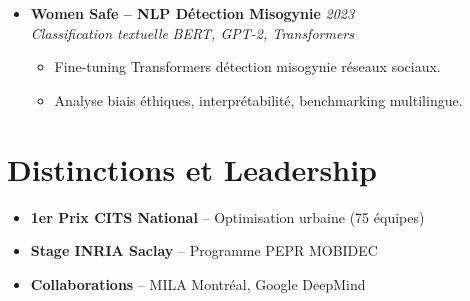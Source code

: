 \documentclass[a4paper,11pt]{article}
\begin{document}
\begin{itemize}[leftmargin=0.5cm, nosep]
    \item \textbf{Women Safe -- NLP D\'etection Misogynie} \hfill \textit{2023} \\
    \textit{Classification textuelle} \hfill \textit{BERT, GPT-2, Transformers}
    \vspace{-2pt}
    \begin{itemize}[leftmargin=0.4cm, nosep, label=\tiny$\bullet$]
        \item \small{Fine-tuning Transformers d\'etection misogynie r\'eseaux sociaux.}
        \item \small{Analyse biais \'ethiques, interpr\'etabilit\'e, benchmarking multilingue.}
    \end{itemize}
\end{itemize}

\section{Distinctions et Leadership}
\begin{itemize}[leftmargin=0.5cm, nosep]
    \item \textbf{1er Prix CITS National} -- Optimisation urbaine (75 \'equipes)
    \item \textbf{Stage INRIA Saclay} -- Programme PEPR MOBIDEC
    \item \textbf{Collaborations} -- MILA Montr\'eal, Google DeepMind
\end{itemize}
\end{document}
